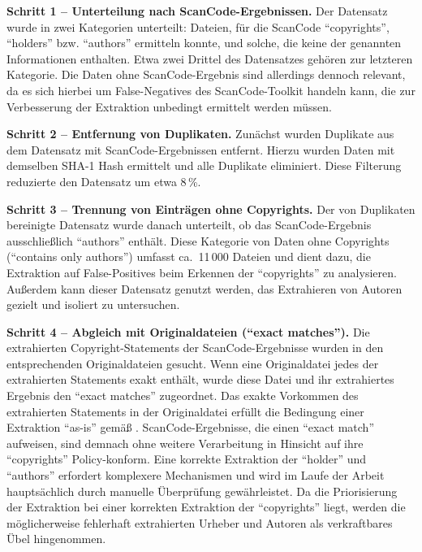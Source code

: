 \textbf{Schritt 1 -- Unterteilung nach ScanCode-Ergebnissen.}
Der Datensatz wurde in zwei Kategorien unterteilt: Dateien, für die ScanCode \enquote{copyrights}, \enquote{holders} bzw. \enquote{authors} ermitteln konnte, und solche, die keine der genannten Informationen enthalten.
Etwa zwei Drittel des Datensatzes gehören zur letzteren Kategorie.
Die Daten ohne ScanCode-Ergebnis sind allerdings dennoch relevant, da es sich hierbei um False-Negatives des ScanCode-Toolkit handeln kann, die zur Verbesserung der Extraktion unbedingt ermittelt werden müssen.

\textbf{Schritt 2 -- Entfernung von Duplikaten.}
Zunächst wurden Duplikate aus dem Datensatz mit ScanCode-Ergebnissen entfernt.
Hierzu wurden Daten mit demselben SHA-1 Hash ermittelt und alle Duplikate eliminiert.
Diese Filterung reduzierte den Datensatz um etwa 8\,\%.

\textbf{Schritt 3 -- Trennung von Einträgen ohne Copyrights.}
Der von Duplikaten bereinigte Datensatz wurde danach unterteilt, ob das ScanCode-Ergebnis ausschließlich \enquote{authors} enthält.
Diese Kategorie von Daten ohne Copyrights (\enquote{contains only authors}) umfasst ca.\ 11\,000 Dateien und dient dazu, die Extraktion auf False-Positives beim Erkennen der \enquote{copyrights} zu analysieren.
Außerdem kann dieser Datensatz genutzt werden, das Extrahieren von Autoren gezielt und isoliert zu untersuchen.

\textbf{Schritt 4 -- Abgleich mit Originaldateien (\enquote{exact matches}).}
Die extrahierten Copyright-Statements der ScanCode-Ergebnisse wurden in den entsprechenden Originaldateien gesucht.
Wenn eine Originaldatei jedes der extrahierten Statements exakt enthält, wurde diese Datei und ihr extrahiertes Ergebnis den \enquote{exact matches} zugeordnet.
Das exakte Vorkommen des extrahierten Statements in der Originaldatei erfüllt die Bedingung einer Extraktion \enquote{as-is} gemäß .
ScanCode-Ergebnisse, die einen \enquote{exact match} aufweisen, sind demnach ohne weitere Verarbeitung in Hinsicht auf ihre \enquote{copyrights} Policy-konform.
Eine korrekte Extraktion der \enquote{holder} und \enquote{authors} erfordert komplexere Mechanismen und wird im Laufe der Arbeit hauptsächlich durch manuelle Überprüfung gewährleistet.
Da die Priorisierung der Extraktion bei einer korrekten Extraktion der \enquote{copyrights} liegt, werden die möglicherweise fehlerhaft extrahierten Urheber und Autoren als verkraftbares Übel hingenommen.

